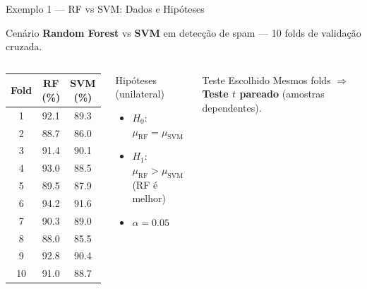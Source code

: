 \documentclass[aspectratio=169]{beamer}
\begin{document}
\begin{frame}[shrink=5]{Exemplo 1 — RF vs SVM: Dados e Hipóteses}
    \begin{block}{Cenário}
        \footnotesize
        \textbf{Random Forest} vs \textbf{SVM} em detecção de spam --- 10 folds de validação cruzada.
    \end{block}
    \pause
    \begin{columns}
        \begin{center}\footnotesize
        \begin{tabular}{ccc}
        \toprule
        Fold & RF (\%) & SVM (\%) \\
        \midrule
        1  & 92{.}1 & 89{.}3 \\
        2  & 88{.}7 & 86{.}0 \\
        3  & 91{.}4 & 90{.}1 \\
        4  & 93{.}0 & 88{.}5 \\
        5  & 89{.}5 & 87{.}9 \\
        6  & 94{.}2 & 91{.}6 \\
        7  & 90{.}3 & 89{.}0 \\
        8  & 88{.}0 & 85{.}5 \\
        9  & 92{.}8 & 90{.}4 \\
        10 & 91{.}0 & 88{.}7 \\
        \bottomrule
        \end{tabular}
        \end{center}
        \pause
        \begin{block}{Hipóteses (unilateral)}
            \footnotesize
            \begin{itemize}
                \item $H_0$: $\mu_{\text{RF}} = \mu_{\text{SVM}}$
                \item $H_1$: $\mu_{\text{RF}} > \mu_{\text{SVM}}$ (RF é melhor)
                \item $\alpha = 0{.}05$
            \end{itemize}
        \end{block}
        \pause
        \begin{block}{Teste Escolhido}
            \footnotesize
            Mesmos folds $\Rightarrow$ \textbf{Teste $t$ pareado} (amostras dependentes).
        \end{block}
    \end{columns}
\end{frame}
\end{document}
